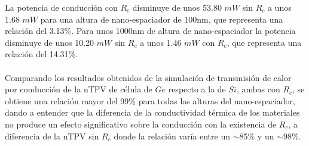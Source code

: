 La potencia de conducción con $R_c$ disminuye de unos 53.80 $mW$ sin $R_c$ a unos 1.68 $mW$ para una altura de nano-espaciador de 100nm, que representa una relación del 3.13\%. Para unos 1000nm de altura de nano-espaciador la potencia disminuye de unos 10.20 $mW$ sin $R_c$ a unos 1.46 $mW$ con $R_c$, que representa una relación del 14.31\%.\\\\
Comparando los resultados obtenidos de la simulación de transmisión de calor por conducción de la nTPV de célula de $Ge$ respecto a la de $Si$, ambas con $R_c$, se obtiene una relación mayor del 99\% para todas las alturas del nano-espaciador, dando a entender que la diferencia de la conductividad térmica de los materiales no produce un efecto significativo sobre la conducción con la existencia de $R_c$, a diferencia de la nTPV sin $R_c$ donde la relación varía entre un $\sim$85\% y un $\sim$98\%.
\vfill
